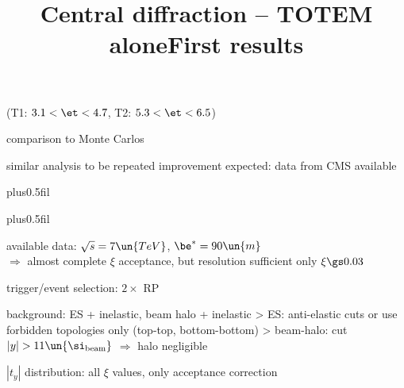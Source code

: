 \centerline{}

\centerline{(T1: $3.1 < \et < 4.7$, T2: $5.3 < \et < 6.5$)}

\> comparison to Monte Carlos

\centerline{}


\vfil
\noindent{}

{
\> similar analysis to be repeated
\> improvement expected: data from CMS available
}


\newpage %
\hbox{}
\vfil
\title{Central diffraction -- TOTEM alone}

\vskip0pt plus0.5fil

\vskip0pt plus0.5fil


\newpage %
\title{First results}

\> available data: $\sqrt s = 7\un{TeV}$, $\be^* = 90\un{m}$\\
$\Rightarrow$ almost complete $\xi$ acceptance, but resolution sufficient only $\xi \gs 0.03$

\> trigger/event selection: $2\times$ RP

\> background: ES + inelastic, beam halo + inelastic
\>> ES: anti-elastic cuts or use forbidden topologies only (top-top, bottom-bottom)
\>> beam-halo: cut $|y| > 11\un{\si_{\rm beam}}$ $\Rightarrow$ halo negligible

\> $|t_y|$ distribution: all $\xi$ values, only acceptance correction





